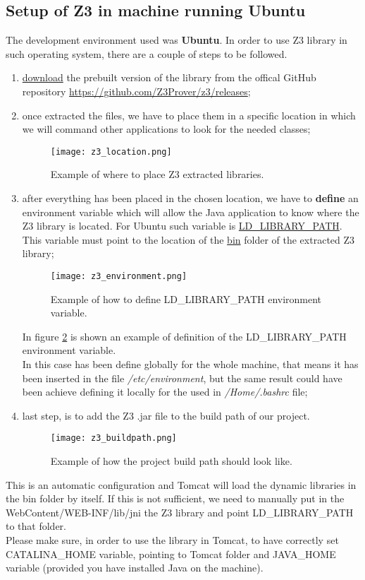 \subsection{Setup of Z3 in machine running Ubuntu}
The development environment used was \textbf{Ubuntu}. In order to use Z3 library in such operating system, there are a couple of steps to be followed.
\begin{enumerate}
  \item \underline{download} the prebuilt version of the library from the offical GitHub repository \url{https://github.com/Z3Prover/z3/releases};
  \item once extracted the files, we have to place them in a specific location in which we will command other applications to look for the needed classes;
  \begin{figure}[!htb]
     \centering
     \texttt{[image: z3\_location.png]}
     \caption{Example of where to place Z3 extracted libraries.}\label{Fig:Z3Location}
  \end{figure}
  \item after everything has been placed in the chosen location, we have to \textbf{define} an environment variable which will allow the Java application to know where the Z3 library is located. For Ubuntu such variable is \underline{LD\_LIBRARY\_PATH}. This variable must point to the location of the \underline{bin} folder of the extracted Z3 library;
  \begin{figure}[!htb]
     \centering
     \texttt{[image: z3\_environment.png]}
     \caption{Example of how to define LD\_LIBRARY\_PATH environment variable.}\label{Fig:Z3Environment}
  \end{figure}
  In figure \ref{Fig:Z3Environment} is shown an example of definition of the LD\_LIBRARY\_PATH environment variable. \\
  In this case has been define globally for the whole machine, that means it has been inserted in the file \textit{/etc/environment}, but the same result could have been achieve defining it locally for the used in \textit{/Home/.bashrc} file;
  \item last step, is to add the Z3 .jar file to the build path of our project.
  \begin{figure}[!htb]
     \centering
     \texttt{[image: z3\_buildpath.png]}
     \caption{Example of how the project build path should look like.}\label{Fig:Z3BuildPath}
  \end{figure}
\end{enumerate}
This is an automatic configuration and Tomcat will load the dynamic libraries in the bin folder by itself. If this is not sufficient, we need to manually put in the WebContent/WEB-INF/lib/jni the Z3 library and point LD\_LIBRARY\_PATH to that folder.\\
Please make sure, in order to use the library in Tomcat, to have correctly set CATALINA\_HOME variable, pointing to Tomcat folder and JAVA\_HOME variable (provided you have installed Java on the machine).

